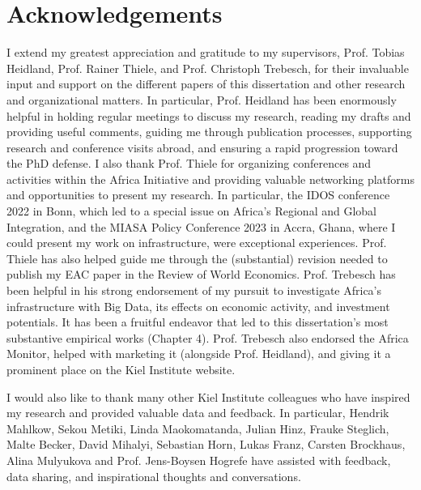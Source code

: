 \documentclass[openany]{book}
\begin{document}


\appendix

\chapter{Acknowledgements}
\thispagestyle{empty}
\newpage

\hphantom{a}
\vspace{1cm}

I extend my greatest appreciation and gratitude to my supervisors, Prof. Tobias Heidland, Prof. Rainer Thiele, and Prof. Christoph Trebesch, for their invaluable input and support on the different papers of this dissertation and other research and organizational matters. In particular, Prof. Heidland has been enormously helpful in holding regular meetings to discuss my research, reading my drafts and providing useful comments, guiding me through publication processes, supporting research and conference visits abroad, and ensuring a rapid progression toward the PhD defense. I also thank Prof. Thiele for organizing conferences and activities within the Africa Initiative and providing valuable networking platforms and opportunities to present my research. In particular, the IDOS conference 2022 in Bonn, which led to a special issue on Africa's Regional and Global Integration, and the MIASA Policy Conference 2023 in Accra, Ghana, where I could present my work on infrastructure, were exceptional experiences. Prof. Thiele has also helped guide me through the (substantial) revision needed to publish my EAC paper in the Review of World Economics. Prof. Trebesch has been helpful in his strong endorsement of my pursuit to investigate Africa's infrastructure with Big Data, its effects on economic activity, and investment potentials. It has been a fruitful endeavor that led to this dissertation's most substantive empirical works (Chapter 4). Prof. Trebesch also endorsed the Africa Monitor, helped with marketing it (alongside Prof. Heidland), and giving it a prominent place on the Kiel Institute website. \newline 

 I would also like to thank many other Kiel Institute colleagues who have inspired my research and provided valuable data and feedback. In particular, Hendrik Mahlkow, Sekou Metiki, Linda Maokomatanda, Julian Hinz, Frauke Steglich, Malte Becker, David Mihalyi, Sebastian Horn, Lukas Franz, Carsten Brockhaus, Alina Mulyukova and Prof. Jens-Boysen Hogrefe have assisted with feedback, data sharing, and inspirational thoughts and conversations. \newline
 
\end{document}
